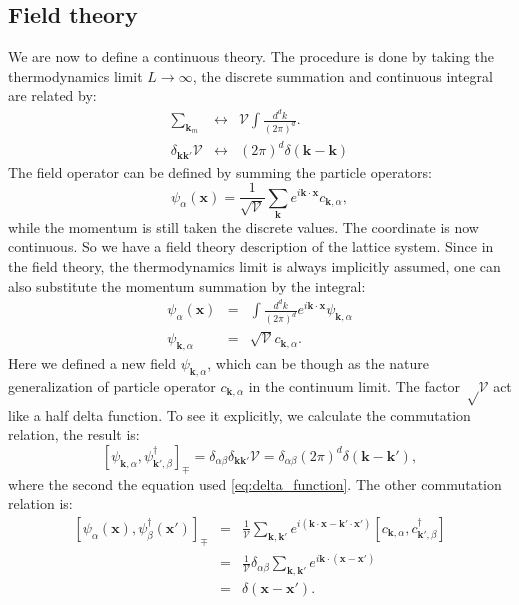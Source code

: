 \documentclass[journal=jacsat,manuscript=article]{achemso}
\begin{document}
\subsection{Field theory}
We are now to define a continuous theory. The procedure is done by taking the thermodynamics limit $L\rightarrow\infty$, the discrete summation and continuous integral are related by:
\begin{eqnarray}
	\sum_{\bm{k}_{m}} & \leftrightarrow & 
	\mathcal{V}\int\frac{d^{d}k}{\left(2\pi\right)^{d}}.\\
	\delta_{\bm{k}\bm{k}'}\mathcal{V} & \leftrightarrow & 
	\left(2\pi\right)^{d}\delta\left(\bm{k}-\bm{k}\right) 
	\label{eq:delta_function}
\end{eqnarray}
The field operator can be defined by summing the particle operators:
\begin{equation}
	\psi_{\alpha}\left(\bm{x}\right)
	=\frac{1}{\sqrt{\mathcal{V}}}\sum_{\bm{k}}e^{i\bm{k}\cdot\bm{x}}c_{\bm{k},\alpha},
\end{equation}
while the momentum is still taken the discrete values. The coordinate is now continuous. So we have a field theory description of the lattice system. Since in the field theory, the thermodynamics limit is always implicitly assumed, one can also substitute the momentum summation by the integral:
\begin{eqnarray}
	\psi_{\alpha}\left(\bm{x}\right) & = & 
	\int\frac{d^{d}k}{\left(2\pi\right)^{d}}e^{i\bm{k}\cdot\bm{x}}\psi_{\bm{k},\alpha}\\
	\psi_{\bm{k},\alpha} & = & \sqrt{\mathcal{V}}c_{\bm{k},\alpha}.
\end{eqnarray}
Here we defined a new field $\psi_{\bm k,\alpha}$, which can be though as the nature generalization of particle operator $c_{\bm k,\alpha}$ in the continuum limit. The factor $\sqrt \mathcal V$ act like a half delta function. To see it explicitly, we calculate the commutation relation, the result is:
\begin{equation}
	\left[\psi_{\bm{k},\alpha},\psi_{\bm{k}',\beta}^{\dagger}\right]_{\mp} 
	=\delta_{\alpha\beta}\delta_{\bm{k}\bm{k}'}\mathcal{V}
  	=\delta_{\alpha\beta}\left(2\pi\right)^{d}\delta\left(\bm{k}-\bm{k}'\right),
\end{equation}
where the second the equation used \eqref{eq:delta_function}. The other commutation relation is:
\begin{eqnarray}
	\left[\psi_{\alpha}\left(\bm{x}\right),\psi_{\beta}^{\dagger}\left(\bm{x}'\right)\right]_{\mp} 
	& = & \frac{1}{\mathcal{V}}\sum_{\bm{k},\bm{k}'}e^{i\left(\bm{k}\cdot\bm{x}-\bm{k}'\cdot\bm{x}'\right)}\left[c_{\bm{k},\alpha},c_{\bm{k}',\beta}^{\dagger}\right]\nonumber \\
 	& = & \frac{1}{\mathcal{V}}\delta_{\alpha\beta}\sum_{\bm{k},\bm{k}'}e^{i\bm{k}\cdot\left(\bm{x}-\bm{x}'\right)}\nonumber \\
 	& = & \delta\left(\bm{x}-\bm{x}'\right).
\end{eqnarray}
\end{document}
